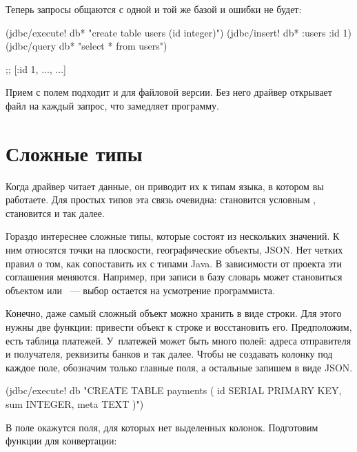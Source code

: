 Теперь запросы общаются с одной и той же базой и ошибки не будет:

\begin{english}
  \begin{clojure}
(jdbc/execute! db* "create table users (id integer)")
(jdbc/insert! db* :users {:id 1})
(jdbc/query db* "select * from users")

;; [{:id 1, ...}, ...]
  \end{clojure}
\end{english}

Прием с полем  подходит и для файловой версии. Без него драйвер открывает файл на каждый запрос, что замедляет программу.

\section{Сложные типы}


Когда драйвер читает данные, он приводит их к типам языка, в котором вы работаете. Для простых типов эта связь очевидна:  становится условным ,  становится  и так далее.


Гораздо интереснее сложные типы, которые состоят из нескольких значений. К ним относятся точки на плоскости, географические объекты, JSON. Нет четких правил о том, как сопоставить их с типами Java. В зависимости от проекта эти соглашения меняются. Например, при записи в базу словарь может становиться объектом  или ~--- выбор остается на усмотрение программиста.

Конечно, даже самый сложный объект можно хранить в виде строки. Для этого нужны две функции: привести объект к строке и восстановить его. Предположим, есть таблица платежей. У~платежей может быть много полей: адреса отправителя и получателя, реквизиты банков и так далее. Чтобы не создавать колонку под каждое поле, обозначим только главные поля, а остальные запишем в виде JSON.

\begin{english}
  \begin{clojure}
(jdbc/execute! db "CREATE TABLE payments (
  id SERIAL PRIMARY KEY,
  sum INTEGER,
  meta TEXT
)")
  \end{clojure}
\end{english}

В поле  окажутся поля, для которых нет выделенных колонок. Подготовим функции для конвертации:


